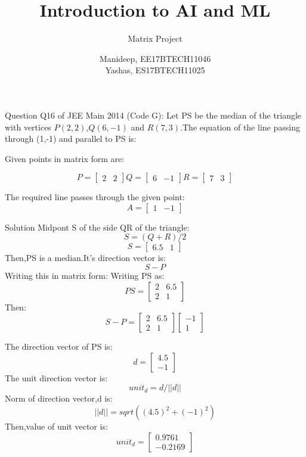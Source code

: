 \documentclass{beamer}
\title{Introduction to AI and ML}
\subtitle{Matrix Project}
\author{Manideep, EE17BTECH11046 \\ Yashas, ES17BTECH11025}
\begin{document}
\begin{frame}

\titlepage
 
\end{frame}  

\begin{frame}[t]{Question}
Q16 of JEE Main 2014 (Code G):
Let PS be the median of the triangle with vertices $P(2,2) $,$ Q(6,-1)$ and $R(7,3)$.The equation of the line passing through (1,-1) and parallel to PS is:

\vspace{1.5em}

Given points in matrix form are:
\vspace{1.5em}

\[P=
\begin{bmatrix}
2 & 2
\end{bmatrix}
 Q=
\begin{bmatrix}
6 & -1
\end{bmatrix}
 R=
\begin{bmatrix}
7 & 3
\end{bmatrix}
\]

\vspace{1.5em}

The required line passes through the given point:
\[A=
\begin{bmatrix}
1 & -1 
\end{bmatrix}
\]

\end{frame}
\begin{frame}{Solution}
Midpont S of the side QR of the triangle:
\[S=
(Q+R)/2
\]
\[
S=
\begin{bmatrix}
6.5 & 1
\end{bmatrix}
\]
Then,PS is a median.It's direction vector is:
\[S
-
P
\]
Writing this in matrix form:
Writing PS as:
\[
PS=
\begin{bmatrix}
2 & 6.5\\
2 & 1
\end{bmatrix}
\]
Then:
\[
S-P=
\begin{bmatrix}
2 & 6.5\\
2 & 1
\end{bmatrix}
\begin{bmatrix}
-1 \\
 1
\end{bmatrix}
\]
\end{frame}

\begin{frame}
The direction vector of PS is:
\[d = 
\begin{bmatrix}
4.5\\
-1
\end{bmatrix}
\]
The unit direction vector is:
\[unit_d =
d/||d|| 
\]
Norm of direction vector,d is:
\[
||d||=sqrt((4.5)^2 + (-1)^2)
\]
Then,value of unit vector is:
\[unit_d = 
\begin{bmatrix}
0.9761\\
-0.2169
\end{bmatrix}
\]
\end{frame}
   
\end{document}
